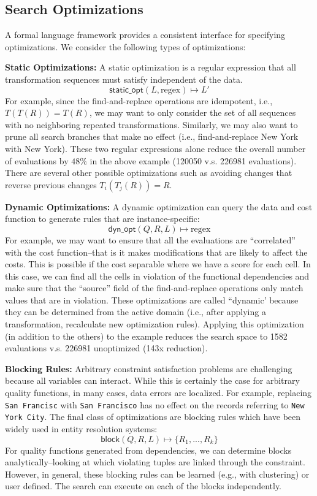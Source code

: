 \subsection{Search Optimizations}
A formal language framework provides a consistent interface for specifying optimizations. We consider the following types of optimizations:

\vspace{0.5em}\noindent\textbf{Static Optimizations: } A static optimization is a regular expression that all transformation sequences must satisfy independent of the data. 
\[\textsf{static\_opt}(L, \text{regex} ) \mapsto L'\]
For example, since the find-and-replace operations are idempotent, i.e., $T(T(R)) = T(R)$, we may want to only consider the set of all sequences with no neighboring repeated transformations. Similarly, we may also want to prune all search branches that make no effect (i.e., find-and-replace New York with New York).
These two regular expressions alone reduce the overall number of evaluations by $48\%$ in the above example (120050 v.s. 226981 evaluations).
There are several other possible optimizations  such as avoiding changes that reverse previous changes $T_i(T_j(R)) = R$.


\vspace{0.5em}\noindent\textbf{Dynamic Optimizations: } A dynamic optimization can query the data and cost function to generate rules that are instance-specific:
\[\textsf{dyn\_opt}(Q, R, L) \mapsto \text{regex}\]
For example, we may want to ensure that all the evaluations are ``correlated'' with the cost function--that is it makes modifications that are likely to affect the costs.
This is possible if the cost separable where we have a score for each cell. In this case, we can find all the cells in violation of the functional dependencies and make sure that the ``source'' field of the find-and-replace operations only match values that are in violation.
These optimizations are called ``dynamic' because they can be determined from the active domain (i.e., after applying a transformation, recalculate new optimization rules).
Applying this optimization (in addition to the others) to the example reduces the search space to 1582 evaluations v.s. 226981 unoptimized (143x reduction).

\vspace{0.5em}\noindent\textbf{Blocking Rules: }  Arbitrary constraint satisfaction problems are challenging because all variables can interact. While this is certainly the case for arbitrary quality functions, in many cases, data errors are localized. For example, replacing \texttt{San Francisc} with \texttt{San Francisco} has no effect on the records referring to \texttt{New York City}. The final class of optimizations are blocking rules which have been widely used in entity resolution systems:
\[\textsf{block}(Q, R, L) \mapsto \{R_1,...,R_k\} \]
For quality functions generated from dependencies, we can determine blocks analytically--looking at which violating tuples are linked through the constraint.
However, in general, these blocking rules can be learned (e.g., with clustering) or user defined.
The search can execute on each of the blocks independently.


